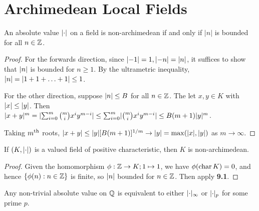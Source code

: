 \documentclass[10pt,a4paper]{article}
\begin{document}
\section{Archimedean Local Fields}
\begin{lemma}
  An absolute value $\lvert\cdot\rvert$ on a field is non-archimedean if and only if $|n|$ is bounded for all $n \in \mathbb{Z}$.
\end{lemma}
\begin{proof}
  For the forwards direction, since $\lvert-1\rvert = 1, \lvert-n\rvert=\lvert n\rvert$, it suffices to show that $\lvert n\rvert$ is bounded for $n \geq 1$. By the ultrametric inequality, $\lvert n\rvert = \lvert1+1+\ldots+1\rvert \leq 1$.

  For the other direction, suppose $\lvert n\rvert \leq B$ for all $n \in \mathbb{Z}$. The let $x, y \in K$ with $\lvert x\rvert\leq \lvert y\rvert$. Then $\lvert x+y\rvert^m = \lvert\sum_{i=0}^m \binom{m}{i}x^i y^{m-i}\rvert \leq \sum_{i=0}^m \lvert\binom{m}{i}x^iy^{m-i}\rvert\leq B(m+1)\lvert y\rvert^m$.

  Taking $m\textsuperscript{th}$ roots, $\lvert x+y\rvert \leq \lvert y\rvert[B(m+1)]^{1/m} \to \lvert y\rvert = \max(\lvert x\rvert, \lvert y\rvert)$ as $m \to \infty$.
\end{proof}
\begin{corollary}
  If $(K,\lvert\cdot\rvert)$ is a valued field of positive characteristic, then $K$ is non-archimedean.
\end{corollary}
\begin{proof}
  Given the homomorphism $\phi:\mathbb{Z} \to K; 1 \mapsto 1$, we have $\phi(\operatorname{char} K) = 0$, and hence $\{\phi(n): n \in \mathbb{Z}\}$ is finite, so $\lvert n\rvert$ bounded for $n \in \mathbb{Z}$. Then apply \textbf{9.1}.
\end{proof}
\begin{theorem}
    Any non-trivial absolute value on $\mathbb{Q}$ is equivalent to either $\lvert\cdot\rvert_\infty$ or $\lvert\cdot\rvert_p$ for some prime $p$.
\end{theorem}
\end{document}
